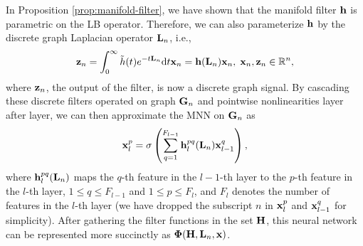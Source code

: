 In Proposition \ref{prop:manifold-filter}, we have shown that the manifold filter ${\mathbf h}$ is parametric on the LB operator. Therefore, we can also parameterize ${\mathbf h}$ by the discrete graph Laplacian operator ${\mathbf L}_n$, i.e.,
\begin{equation}\label{eqn:sample_manifold_convolution}
    {\ensuremath{\mathbf z}}_n = \int_{0}^\infty {\ensuremath{\tilde h}}(t) e^{-t{\mathbf L}_n} \text{d}t {\mathbf x}_n={\mathbf h}({\mathbf L}_n){\mathbf x}_n, \; {\mathbf x}_n, {\mathbf z}_n \in{\mathbb R}^n, 
\end{equation}
where ${\mathbf z}_n$, the output of the filter, is now a discrete graph signal.
By cascading these discrete filters operated on graph ${\mathbf G}_n$ and pointwise nonlinearities layer after layer, we can then approximate the MNN on ${\mathbf G}_n$ as
\begin{equation}\label{eqn:dis-mnn}
    {\ensuremath{\mathbf x}}_l^p = \sigma\left(\sum_{q=1}^{F_{l-1}} {\mathbf h}_l^{pq}({\mathbf L}_n) {\mathbf x}^q_{l-1} \right),
\end{equation}
where ${\mathbf h}_l^{pq}({\mathbf L}_n)$ maps the $q$-th feature in the $l-1$-th layer to the $p$-th feature in the $l$-th layer, $1\leq q \leq F_{l-1}$ and $1\leq p\leq F_l$, and $F_l$ denotes the number of features in the $l$-th layer (we have dropped the subscript $n$ in ${\mathbf x}_l^p$ and ${\mathbf x}_{l-1}^q$ for simplicity).
After gathering the filter functions in the set ${\mathbf H}$, this neural network %
can be represented more succinctly as $\bm\Phi({\mathbf H}, {\mathbf L}_n, {\mathbf x})$. 

